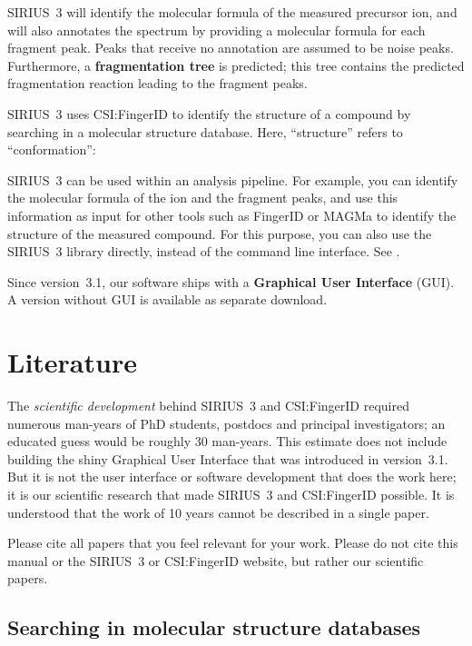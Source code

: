\documentclass[letterpaper,10pt,openany,oneside]{sphinxmanual}
\begin{document}
SIRIUS~3 will identify the molecular formula of the measured precursor ion,
and will also annotates the spectrum by providing a molecular formula for
each fragment peak.  Peaks that receive no annotation are assumed to be noise
peaks.  Furthermore, a \textbf{fragmentation tree} is predicted; this tree
contains the predicted fragmentation reaction leading to the fragment peaks.

SIRIUS~3 uses CSI:FingerID to identify the structure of a compound by
searching in a molecular structure database.  Here, ``structure'' refers to
``conformation'': 

SIRIUS~3 can be used within an analysis pipeline. For example, you can
identify the molecular formula of the ion and the fragment peaks, and use
this information as input for other tools such as FingerID or MAGMa to
identify the structure of the measured compound. For this purpose, you can
also use the SIRIUS~3 library directly, instead of the command line
interface. See {\hyperref[library::doc]{}}.

Since version~3.1, our software ships with a \textbf{Graphical User
Interface} (GUI).  A version without GUI is available as separate download.

\clearpage


\section{Literature}
\label{introduction:literature}

The \emph{scientific development} behind SIRIUS~3 and CSI:FingerID required
numerous man-years of PhD students, postdocs and principal investigators; an
educated guess would be roughly 30 man-years.  This estimate does not include
building the shiny Graphical User Interface that was introduced in
version~3.1.  But it is not the user interface or software development that
does the work here; it is our scientific research that made SIRIUS~3 and
CSI:FingerID possible.  It is understood that the work of 10 years cannot be
described in a single paper.

Please cite all papers that you feel relevant for your work.  Please do not
cite this manual or the SIRIUS~3 or CSI:FingerID website, but rather our
scientific papers.

\subsection{Searching in molecular structure databases}
\label{introduction:searching-in-molecular-structure-databases}
\end{document}
